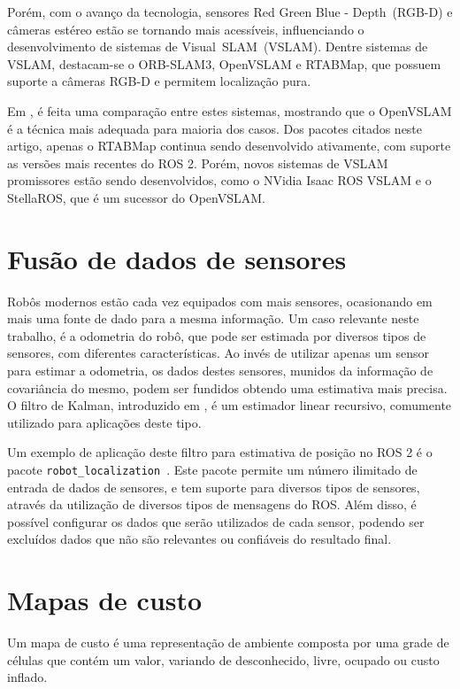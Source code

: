 \documentclass[repeatfields,xlists,xpacks,oneside,yearsonly]{ufrgscca}
\begin{document}
Porém, com o avanço da tecnologia, sensores Red Green Blue -
Depth~(RGB-D) e câmeras estéreo estão se tornando mais acessíveis,
influenciando o desenvolvimento de sistemas de Visual~SLAM~(VSLAM).
Dentre sistemas de VSLAM, destacam-se o ORB-SLAM3, OpenVSLAM e
RTABMap, que possuem suporte a câmeras RGB-D e permitem localização
pura.

Em \textcite{VSLAM}, é feita uma comparação entre estes sistemas,
mostrando que o OpenVSLAM é a técnica mais adequada para maioria dos
casos. Dos pacotes citados neste artigo, apenas o RTABMap continua
sendo desenvolvido ativamente, com suporte as versões mais recentes
do ROS 2. Porém, novos sistemas de VSLAM promissores estão sendo
desenvolvidos, como o NVidia Isaac ROS VSLAM e o StellaROS, que é um
sucessor do OpenVSLAM.

\section{Fusão de dados de sensores}

Robôs modernos estão cada vez equipados com mais sensores,
ocasionando em mais uma fonte de dado para a mesma informação. Um
caso relevante neste trabalho, é a odometria do robô, que pode ser
estimada por diversos tipos de sensores, com diferentes
características. Ao invés de utilizar apenas um sensor para estimar a
odometria, os dados destes sensores, munidos da informação de
covariância do mesmo, podem ser fundidos obtendo uma estimativa mais
precisa. O filtro de Kalman, introduzido em \textcite{KalmanFilter},
é um estimador linear recursivo, comumente utilizado para aplicações
deste tipo.

Um exemplo de aplicação deste filtro para estimativa de posição no
ROS 2 é o pacote
\texttt{robot\_localization}~\cite{robot_localization_paper}. Este
pacote permite um número ilimitado de entrada de dados de sensores, e
tem suporte para diversos tipos de sensores, através da utilização de
diversos tipos de mensagens do ROS. Além disso, é possível configurar
os dados que serão utilizados de cada sensor, podendo ser excluídos
dados que não são relevantes ou confiáveis do resultado final.

\section{Mapas de custo}

Um mapa de custo é uma representação de ambiente composta por uma
grade de células que contém um valor, variando de desconhecido,
livre, ocupado ou custo inflado.
\end{document}
